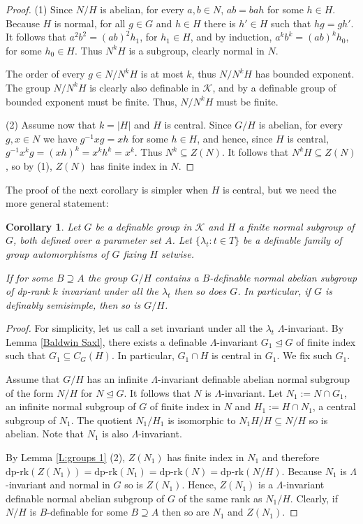 \documentclass[11pt]{amsart}
\newtheorem{corollary}[theorem]{Corollary}
\theoremstyle{definition}
\newcommand{\CK}{{\mathcal K}}
\newcommand{\0}{\emptyset}
\def\dpr{\mathrm{dp\text{-}rk}}
\def\sub{\subseteq}
\begin{document}
\begin{proof} (1) Since $N/H$ is abelian, for every $a,b\in N$, $ab=bah$ for some $h\in H$. Because $H$ is normal, for all $g\in G$ and $h\in H$ there is $h'\in H$ such that $hg=gh'$. It follows that $a^2b^2=(ab)^2h_1$, for $h_1\in H$, and by induction, $a^kb^k=(ab)^k h_0$, for some $h_0\in H$. Thus $N^kH$ is a subgroup, clearly normal in $N$.

The order of every  $g\in N/N^kH$ is at most $k$, thus $N/N^kH$ has bounded exponent.
The group $N/N^kH$ is clearly also definable in $\CK$, and by  \cite[Theorem 7.4, Theorem 7.7 and Theorem 7.11]{HaHaPeGps} a definable group of bounded exponent must be finite. 
Thus, $N/N^kH$ must be finite.

(2) Assume now that $k=|H|$ and $H$ is central. Since $G/H$ is abelian,  for every $g, x\in N$ we have $g^{-1}xg=x h$ for some $h\in H$, and hence, since $H$ is central,  $g^{-1}x^k g=(xh)^k=x^kh^k=x^k$. Thus $N^k\sub Z(N)$. It follows that $N^kH\sub Z(N)$, so by (1), $Z(N)$ has finite index in $N$.
\end{proof}

The proof of the next corollary is simpler when $H$ is central, but we need the more general statement: 
\begin{corollary}\label{C: semisimple in quotients}
 Let $G$ be a definable group in $\CK$ and $H$ a finite normal subgroup of $G$, both defined over a parameter set $A$. Let $\{\lambda_t: t\in T\}$ be a definable family of group automorphisms of $G$ fixing $H$ setwise.

 If for some $B\supseteq A$ the group $G/H$ contains a $B$-definable normal abelian subgroup of dp-rank $k$  invariant under all the $\lambda_t$ then so does  $G$. In particular, if $G$ is definably semisimple, then so is $G/H$.
\end{corollary}
\begin{proof} 
 For simplicity, let us call a set invariant under all the $\lambda_t$ $\Lambda$-invariant.  By Lemma \ref{Baldwin Saxl}, there exists a definable $\Lambda$-invariant $G_1\trianglelefteq G$ of finite index  such that $G_1\sub C_G(H)$. In particular, $G_1\cap H$ is central in $G_1$. We fix such $G_1$.

 Assume that $G/H$ has an infinite $\Lambda$-invariant definable abelian normal subgroup of the form $N/H$ for $N\trianglelefteq G$.  It follows that $N$ is $\Lambda$-invariant. Let  $N_1:=N\cap G_1$, an infinite normal subgroup of $G$ of finite index in $N$ and $H_1:=H\cap N_1$, a central subgroup of $N_1$. The quotient $N_1/H_1$ is isomorphic to $N_1H/H\sub N/H$ so is  abelian. Note that $N_1$ is also $\Lambda$-invariant. 

By Lemma \ref{L:groups 1} (2), $Z(N_1)$ has finite index in $N_1$ and therefore $\dpr(Z(N_1))=\dpr(N_1)=\dpr(N)=\dpr(N/H)$. Because $N_1$ is $\Lambda$-invariant and normal in $G$ so is $Z(N_1)$. Hence, $Z(N_1)$ is a $\Lambda$-invariant definable  normal abelian subgroup of $G$ of the same rank as $N_1/H$. Clearly, if $N/H$ is $B$-definable for some $B\supseteq A$ then so are $N_1$ and $Z(N_1)$. 
\end{proof}
\end{document}
